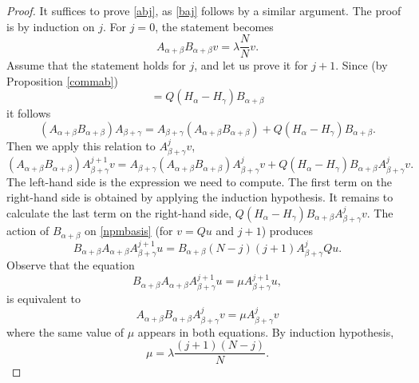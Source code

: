 \documentclass[twoside,a4paper,12pt]{article}
\theoremstyle{definition}
\begin{document}
\begin{proof}
	It suffices to prove \eqref{abj}, as \eqref{baj} follows by a similar
	argument. The proof is by induction on $j$. For $j=0$, the statement becomes
	\begin{equation*}
		A_{\alpha+\beta}B_{\alpha+\beta}v=\lambda\frac NNv.
	\end{equation*}
	Assume that the statement holds for $j$, and let us prove it for $j+1$.
	Since (by Proposition \ref{commab})
	\begin{equation*}
		[A_{\alpha+\beta}B_{\alpha+\beta},A_{\beta+\gamma}]=
		Q(H_\alpha-H_\gamma)B_{\alpha+\beta}
	\end{equation*}
	it follows
	\begin{equation*}
		(A_{\alpha+\beta}B_{\alpha+\beta})A_{\beta+\gamma}=
		A_{\beta+\gamma}(A_{\alpha+\beta}B_{\alpha+\beta})
		+Q(H_\alpha-H_\gamma)B_{\alpha+\beta}.
	\end{equation*}
	Then we apply this relation to $A_{\beta+\gamma}^jv$,
	\begin{equation}\label{abind}
		(A_{\alpha+\beta}B_{\alpha+\beta})A_{\beta+\gamma}^{j+1}v=
		A_{\beta+\gamma}(A_{\alpha+\beta}B_{\alpha+\beta})A_{\beta+\gamma}^jv
		+Q(H_\alpha-H_\gamma)B_{\alpha+\beta}A_{\beta+\gamma}^jv.
	\end{equation}
	The left-hand side is the expression we need to compute.
	The first term on the right-hand side is obtained by applying the induction
	hypothesis. It remains to calculate the last term on the right-hand side,
	$Q(H_\alpha-H_\gamma)B_{\alpha+\beta}A_{\beta+\gamma}^jv$.
	The action of $B_{\alpha+\beta}$ on \eqref{npmbasis} (for $v=Qu$ and $j+1$)
	produces
	\begin{equation}\label{bq}
		B_{\alpha+\beta}A_{\alpha+\beta}A_{\beta+\gamma}^{j+1}u=
		B_{\alpha+\beta}(N-j)(j+1)A_{\beta+\gamma}^jQu.
	\end{equation}
	Observe that the equation
	\begin{equation*}
		B_{\alpha+\beta}A_{\alpha+\beta}A_{\beta+\gamma}^{j+1}u=
		\mu A_{\beta+\gamma}^{j+1}u,
	\end{equation*}
	is equivalent to
	\begin{equation*}
		A_{\alpha+\beta}B_{\alpha+\beta}A_{\beta+\gamma}^jv=
		\mu A_{\beta+\gamma}^jv
	\end{equation*}
	where the same value of $\mu$ appears in both equations.
	By induction hypothesis,
	\begin{equation*}
		\mu=\lambda\frac{(j+1)(N-j)}N.
	\end{equation*}

\end{proof}
\end{document}
